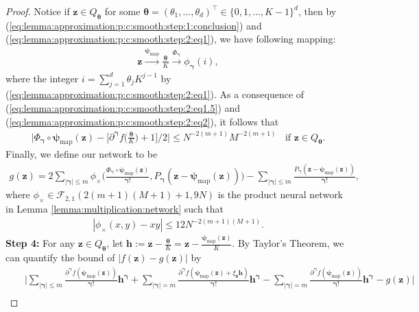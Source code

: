 \documentclass[11pt, preprint]{imsart}
\numberwithin{equation}{section}
\def \mcF{\mathcal{F}}
\def \bfgamma{\bm{\gamma}}
\def \bfz{\mathbf{z}}
\def \bfh{\mathbf{h}}
\def \bftheta{\bm{\theta}}
\theoremstyle{plain}
\theoremstyle{definition}
\begin{document}
\begin{proof}
Notice if $\bfz \in Q_{\bftheta}$ for some $\bftheta=(\theta_1,\ldots, \theta_d)^\top \in \{0, 1,\ldots, K-1\}^d$, then by (\ref{eq:lemma:approximation:p:c:smooth:step:1:conclusion}) and  (\ref{eq:lemma:approximation:p:c:smooth:step:2:eq1}), we have following mapping:
\begin{eqnarray}
	\bfz \xrightarrow{\bm{\psi}_{\textrm{map}}}\frac{\bftheta}{K} \xrightarrow{\Phi_{\bfgamma}}\phi_{\bfgamma}(i),\nonumber
\end{eqnarray}
where the integer $i=\sum_{j=1}^d\theta_jK^{j-1}$ by (\ref{eq:lemma:approximation:p:c:smooth:step:2:eq1}).  As a consequence of  (\ref{eq:lemma:approximation:p:c:smooth:step:2:eq1.5}) and  (\ref{eq:lemma:approximation:p:c:smooth:step:2:eq2}), it follows that
\begin{eqnarray}
	\bigg|\Phi_{\bfgamma}\circ \bm{\psi}_{\textrm{map}}(\bfz)-\bigg[\partial^{\bfgamma}f\bigg(\frac{\bftheta}{K}\bigg)+1\bigg]/2\bigg|\leq N^{-2(m+1)}M^{-2(m+1)}\;\; \textrm{ if } \bfz \in Q_{\bftheta}.\label{eq:lemma:approximation:p:c:smooth:step:3:conclusion}
	\end{eqnarray}
Finally, we define our network to be 
\begin{eqnarray}
	g(\bfz)=2\sum_{|\bfgamma|\leq m}\phi_{\times}\bigg(\frac{\Phi_{\bfgamma}\circ \bm{\psi}_{\textrm{map}}(\bfz)}{\bfgamma !}, P_{\bfgamma}(\bfz- \bm{\psi}_{\textrm{map}}(\bfz))\bigg)-\sum_{|\bfgamma|\leq m}\frac{P_{\bfgamma}(\bfz- \bm{\psi}_{\textrm{map}}(\bfz))}{\bfgamma !},\nonumber
\end{eqnarray}
where $\phi_\times\in \mcF_{2,1}(2(m+1)(M+1)+1, 9N)$ is the product neural network in Lemma \ref{lemma:multiplication:network} such that 
\begin{eqnarray}
	|\phi_\times(x, y)-xy|\leq 12N^{-2(m+1)(M+1)}.\label{eq:lemma:approximation:p:c:smooth:step:3:conclusion:2}
\end{eqnarray}
\noindent \textbf{Step 4:}
For any $\bfz \in Q_{\bftheta}$, let $\bfh:=\bfz-\frac{\bftheta}{K}=\bfz-\frac{\bm{\psi}_{\textrm{map}}(\bfz)}{K}$. By Taylor's Theorem,  we can quantify the bound of $|f(\bfz)-g(\bfz)|$ by
\begin{eqnarray}
	&&\bigg|\sum_{|\bfgamma|\leq m}\frac{\partial^{\bfgamma}f(\bm{\psi}_{\textrm{map}}(\bfz))}{\bfgamma !}\bfh^{\bfgamma}+\sum_{|\bfgamma|= m}\frac{\partial^{\bfgamma}f(\bm{\psi}_{\textrm{map}}(\bfz)+\xi_{\bfz}\bfh)}{\bfgamma !}\bfh^{\bfgamma}-\sum_{|\bfgamma|= m}\frac{\partial^{\bfgamma}f(\bm{\psi}_{\textrm{map}}(\bfz))}{\bfgamma !}\bfh^{\bfgamma}-g(\bfz)\bigg|\nonumber\\

\end{eqnarray}
\end{proof}
\end{document}
